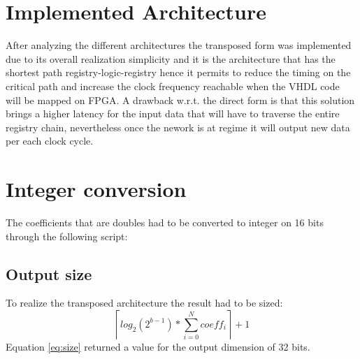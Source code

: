 \section{Implemented Architecture}
After analyzing the different architectures the transposed form was implemented due to its overall realization simplicity and it is the architecture that has the shortest path registry-logic-registry hence it permits to reduce the timing on the critical path and increase the clock frequency reachable when the VHDL code will be mapped on FPGA. A drawback w.r.t. the direct form is that this solution brings a higher latency for the input data that will have to traverse the entire registry chain, nevertheless once the nework is at regime it will output new data per each clock cycle.
\section{Integer conversion}
The coefficients that are doubles had to be converted to integer on 16 bits through the following script:

\subsection{Output size}
\label{sec:sizing}
To realize the transposed architecture the result had to be sized:
\begin{equation}
	\left \lceil log_2(2^{b-1})*\sum_{i=0}^{N} coeff_i\right \rceil	+1
	\label{eq:size}
\end{equation}
Equation \ref{eq:size} returned a value for the output dimension of 32 bits.